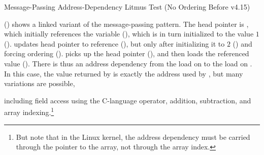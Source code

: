 \QuickQuizEnd

\begin{listing}

\caption{Message-Passing Address-Dependency Litmus Test (No Ordering Before v4.15)}
\label{lst:memorder:Message-Passing Address-Dependency Litmus Test (No Ordering Before v4.15)}
\end{listing}

\begin{fcvref}
()
shows a linked variant of the message-passing pattern.
The head pointer is , which initially
references the  variable  (), which is in turn
initialized to the value $1$ ().
 updates head pointer  to reference  (),
but only after initializing it to $2$ () and forcing ordering
().
 picks up the head pointer  (), and then loads
the referenced value ().
There is thus an address dependency from the load on  to the
load on .
In this case, the value returned by  is exactly the address
used by , but many variations are possible,
\end{fcvref}
including field access using the C-language \co{->} operator,
addition, subtraction, and array indexing.\footnote{
	But note that in the Linux kernel, the address dependency must
	be carried through the pointer to the array, not through the
	array index.}

